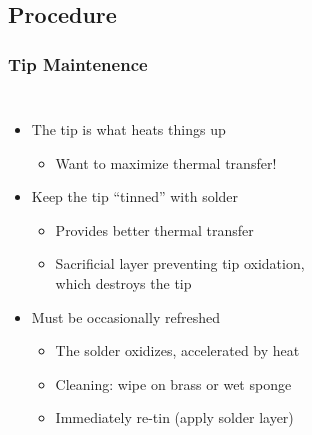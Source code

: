 \documentclass{beamer}
\begin{document}
\subsection{Procedure}
\begin{frame}
\frametitle{Tip Maintenence}
\begin{columns}[t]
\begin{itemize}
  \item The tip is what heats things up
  \begin{itemize}
    \item Want to maximize thermal transfer!
  \end{itemize}
  \item Keep the tip ``tinned'' with solder
  \begin{itemize}
    \item Provides better thermal transfer
    \item Sacrificial layer preventing tip oxidation, \\
    which destroys the tip
  \end{itemize}
  \item Must be occasionally refreshed
  \begin{itemize}
    \item The solder oxidizes, accelerated by heat
    \item Cleaning: wipe on brass or wet sponge
    \item Immediately re-tin (apply solder layer)
  \end{itemize}
\end{itemize}

\begin{figure}
\centering
\end{figure}
\end{columns}
\end{frame}
\end{document}
